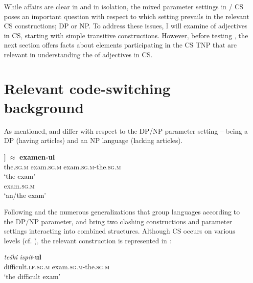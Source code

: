 \documentclass[output=paper,hidelinks,newtxmath,]{langscibook}
\begin{document}
	\z
\z


\noindent While affairs are clear in  and  in isolation, the mixed parameter settings in / CS poses an important question with respect to which setting prevails in the relevant CS constructions; DP or NP. To address these issues, I will examine  of adjectives in CS, starting with simple transitive constructions. However, before testing , the next section offers facts about elements participating in the CS TNP that are relevant in understanding the  of adjectives in CS.

\section{Relevant code-switching background}\label{15:s4}

As mentioned,  and  differ with respect to the DP/NP parameter setting --  being a DP (having articles) and  an NP language (lacking articles).

\ea \label{15:ex9}
	\ea\label{15:ex9a}
    \gll [\textsubscript{DP} \textbf{{}-ul} [\textsubscript{NP} \textbf{examen}]]\hspace{0.6cm} $\approx$\hspace{0.7cm} \textbf{examen-ul}\\          
         {} the\textsc{.sg.m} {} exam\textsc{.sg.m} {} exam\textsc{.sg.m}-the.\textsc{sg.m}\\
         \glt `the exam'
	\ex\label{15:ex9b}
    \\
         {} exam\textsc{.sg.m}\\ 
         \glt `an/the exam'
         
	\z
\z

\noindent Following \citet{Boskovic2008,Boskovic2012} and the numerous generalizations that group languages according to the DP/NP parameter,  and  bring two clashing constructions and parameter settings interacting into combined structures. Although CS occurs on various levels (cf. \citealt{Petroj}), the relevant construction is represented in :

\ea \label{15:ex10}
\gll  \textit{teški} \textit{ispit}{}-\textbf{ul}\\
     difficult.\textsc{lf.sg.m} exam\textsc{.sg.m}-the\textsc{.sg.m}\\
     \glt `the difficult exam'
\z
\end{document}

